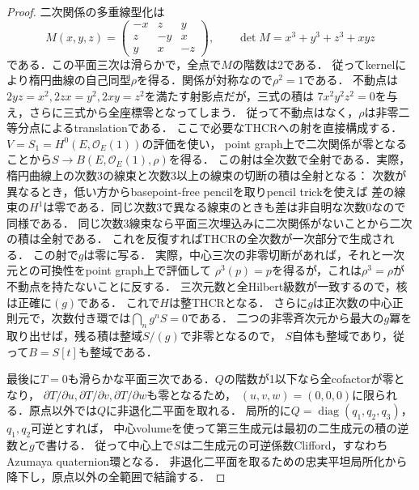 \begin{proof}
二次関係の多重線型化は
\[
 M(x,y,z)=\begin{pmatrix}-x&z&y\\z&-y&x\\y&x&-z\end{pmatrix},\qquad
 \det M=x^3+y^3+z^3+xyz
\]
である．この平面三次は滑らかで，全点で$M$の階数は2である．
従ってkernelにより楕円曲線の自己同型$\rho$を得る．関係が対称なので$\rho^2=1$である．
不動点は$2yz=x^2,2zx=y^2,2xy=z^2$を満たす射影点だが，三式の積は
$7x^2y^2z^2=0$を与え，さらに三式から全座標零となってしまう．
従って不動点はなく，$\rho$は非零二等分点によるtranslationである．
ここで必要なTHCRへの射を直接構成する．$V=S_1=H^0(E,\mathcal O_E(1))$の評価を使い，
point graph上で二次関係が零となることから$S\to B(E,\mathcal O_E(1),\rho)$を得る．
この射は全次数で全射である．実際，楕円曲線上の次数3の線束と次数3以上の線束の切断の積は全射となる：
次数が異なるとき，低い方からbasepoint-free pencilを取りpencil trickを使えば
差の線束の$H^1$は零である．同じ次数3で異なる線束のときも差は非自明な次数0なので同様である．
同じ次数3線束なら平面三次埋込みに二次関係がないことから二次の積は全射である．
これを反復すればTHCRの全次数が一次部分で生成される．
この射で$g$は零に写る．
実際，中心三次の非零切断があれば，それと一次元との可換性をpoint graph上で評価して
$\rho^3(p)=p$を得るが，これは$\rho^3=\rho$が不動点を持たないことに反する．
三次元数と全Hilbert級数が一致するので，核は正確に$(g)$である．
これで$H$は整THCRとなる．
さらに$g$は正次数の中心正則元で，次数付き環では$\bigcap_n g^nS=0$である．
二つの非零斉次元から最大の$g$冪を取り出せば，残る積は整域$S/(g)$で非零となるので，
$S$自体も整域であり，従って$B=S[t]$も整域である．

最後に$T=0$も滑らかな平面三次である．$Q$の階数が1以下なら全cofactorが零となり，
$\partial T/\partial u,\partial T/\partial v,\partial T/\partial w$も零となるため，
$(u,v,w)=(0,0,0)$に限られる．原点以外では$Q$に非退化二平面を取れる．
局所的に$Q=\operatorname{diag}(q_1,q_2,q_3)$，$q_1,q_2$可逆とすれば，
中心volumeを使って第三生成元は最初の二生成元の積の逆数と$g$で書ける．
従って中心上で$S$は二生成元の可逆係数Clifford，すなわちAzumaya quaternion環となる．
非退化二平面を取るための忠実平坦局所化から降下し，原点以外の全範囲で結論する．
\end{proof}

